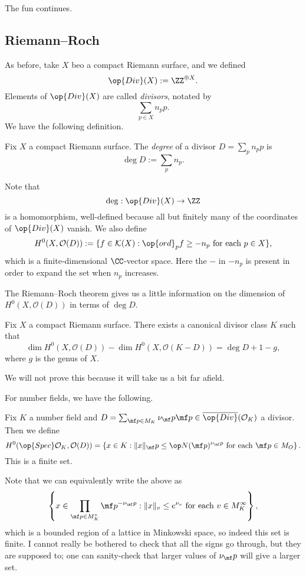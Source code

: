 
















The fun continues.

\subsection{Riemann--Roch}
As before, take $X$ beo a compact Riemann surface, and we defined
\[\op{Div}(X):=\ZZ^{\oplus X}.\]
Elements of $\op{Div}(X)$ are called \textit{divisors}, notated by
\[\sum_{p\in X}n_pp.\]
We have the following definition.
\begin{definition}[Degree]
	Fix $X$ a compact Riemann surface. The \textit{degree} of a divisor $D=\sum_pn_pp$ is
	\[\deg D:=\sum_pn_p.\]
\end{definition}
Note that
\[\deg:\op{Div}(X)\to\ZZ\]
is a homomorphism, well-defined because all but finitely many of the coordinates of $\op{Div}(X)$ vanish. We also define
\[H^0(X,\mathcal O(D)):=\{f\in\mathcal K(X):\op{ord}_pf\ge-n_p\text{ for each }p\in X\},\]
which is a finite-dimensional $\CC$-vector space. Here the $-$ in $-n_p$ is present in order to expand the set when $n_p$ increases.

The Riemann--Roch theorem gives us a little information on the dimension of $H^0(X,\mathcal O(D))$ in terms of $\deg D.$
\begin{theorem}
	Fix $X$ a compact Riemann surface. There exists a canonical divisor class $K$ such that
	\[\dim H^0(X,\mathcal O(D))-\dim H^0(X,\mathcal O(K-D))=\deg D+1-g,\]
	where $g$ is the genus of $X.$
\end{theorem}
We will not prove this because it will take us a bit far afield.

For number fields, we have the following.
\begin{defi}
	Fix $K$ a number field and $D=\sum_{\mf p\in M_K}\nu_\mf p\mf p\in\overline{\op{Div}}(\mathcal O_K)$ a divisor. Then we define
	\[H^0(\op{Spec}\mathcal O_K,\mathcal O(D))=\left\{x\in K:\lVert x\rVert_\mf p\le\op N(\mf p)^{\nu_\mf p}\text{ for each }\mf p\in M_O\right\}.\]
	This is a finite set.
\end{defi}
Note that we can equivalently write the above as
\[\left\{x\in\prod_{\mf p\in M_K^\circ}\mf p^{-\nu_\mf p}:\lVert x\rVert_v\le e^{\nu_v}\text{ for each }v\in M_K^\infty\right\},\]
which is a bounded region of a lattice in Minkowski space, so indeed this set is finite. I cannot really be bothered to check that all the signs go through, but they are supposed to; one can sanity-check that larger values of $\nu_\mf p$ will give a larger set.

